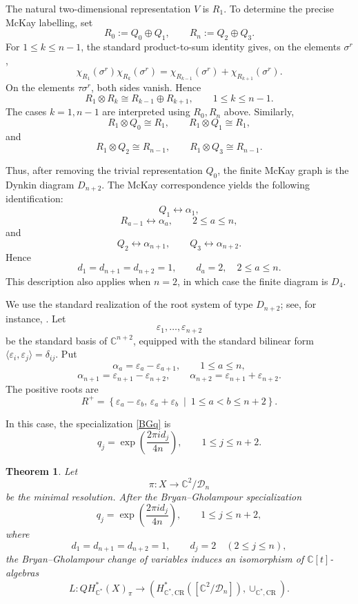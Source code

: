 \documentclass[a4paper,reqno]{amsart}
\theoremstyle{plain} %
\newtheorem{thm}{Theorem}[section]
\theoremstyle{definition} %
\theoremstyle{remark} %
\newcommand{\C}{\mathbb{C}}
\newcommand{\cD}{{\mathcal D}}
\newcommand{\ve}{{\varepsilon}}
\newcommand{\1}{\mathds{1}}   %
\begin{document}
The natural two-dimensional representation $V$ is \(R_1\).
To determine the precise McKay labelling, set
\[
R_0:=Q_0 \oplus Q_1,
\qquad
R_n:= Q_2\oplus Q_3.
\]
For \(1\le k\le n-1\), the standard product-to-sum identity
gives, on the elements \(\sigma^r\),
\[
\chi_{R_1}(\sigma^r)
\chi_{R_k}(\sigma^r)
=
\chi_{R_{k-1}}(\sigma^r)
+
\chi_{R_{k+1}}(\sigma^r).
\]
On the elements \(\tau\sigma^r\), both sides vanish. Hence
\[
R_1\otimes R_k
\cong
R_{k-1}\oplus R_{k+1},
\qquad
1\le k\le n-1.
\]
The cases \(k=1,n-1\) are interpreted using
\( R_0, R_n\) above. Similarly,
\[
R_1\otimes Q_0\cong R_1,
\qquad
R_1\otimes Q_1\cong R_1,
\]
and
\[
R_1\otimes Q_2\cong R_{n-1},
\qquad
R_1\otimes Q_3\cong R_{n-1}.
\]

Thus, after removing the trivial representation \(Q_0\),
the finite McKay graph is the Dynkin diagram \(D_{n+2}\).
The McKay correspondence yields the following identification:
\[
Q_1\longleftrightarrow\alpha_1,
\]
\[
R_{a-1}\longleftrightarrow\alpha_a,
\qquad
2\le a\le n,
\]
and
\[
Q_2\longleftrightarrow\alpha_{n+1},
\qquad
Q_3\longleftrightarrow\alpha_{n+2}.
\]
Hence
\[
d_1=d_{n+1}=d_{n+2}=1,
\qquad
d_a=2,
\quad
2\le a\le n.
\]
This description also applies when \(n=2\), in which case the
finite diagram is \(D_4\).

We use the standard realization of the root system of type
\(D_{n+2}\); see, for instance, \cite{Humphreys}. Let
\[
\varepsilon_1,\ldots,\varepsilon_{n+2}
\]
be the standard basis of $\C^{n+2}$, equipped with the standard bilinear form $\langle \ve_i , \ve_j \rangle = \delta_{ij}$.
Put
\[
\alpha_a=\varepsilon_a-\varepsilon_{a+1},
\qquad
1\le a\le n,
\]
\[
\alpha_{n+1}
=
\varepsilon_{n+1}-\varepsilon_{n+2},
\qquad
\alpha_{n+2}
=
\varepsilon_{n+1}+\varepsilon_{n+2}.
\]
The positive roots are
\[
R^+
=
\left\{
\varepsilon_a-\varepsilon_b,\,
\varepsilon_a+\varepsilon_b
\ \middle|\
1\le a<b\le n+2
\right\}.
\]


In this case, the specialization \eqref{BGq} is
\[
q_j
=
\exp\left(\frac{2\pi i d_j}{4n}\right),
\qquad
1\le j\le n+2.
\]

\begin{thm}\label{thm:D-CCRC}
Let
\[
\pi \colon X\longrightarrow\mathbb C^2/\cD_n
\]
be the minimal resolution. After the Bryan--Gholampour
specialization
\[
q_j
=
\exp\left(\frac{2\pi i d_j}{4n}\right),
\qquad
1\le j\le n+2,
\]
where
\[
d_1=d_{n+1}=d_{n+2}=1,
\qquad
d_j=2
\quad(2\le j\le n),
\]
the Bryan--Gholampour change of variables induces an
isomorphism of \(\mathbb C[t]\)-algebras
\[
L:
QH_{\mathbb C^*}^*(X)_{\pi}
\longrightarrow
\left(
H_{\mathbb C^*,\mathrm{CR}}^*
([\mathbb C^2/\cD_n]),
\cup_{\mathbb C^*,\mathrm{CR}}
\right).
\]
\end{thm}
\end{document}
